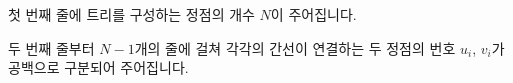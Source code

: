 첫 번째 줄에 트리를 구성하는 정점의 개수 $N$이 주어집니다.

두 번째 줄부터 $N-1$개의 줄에 걸쳐 각각의 간선이 연결하는 두 정점의 번호 $u_i$, $v_i$가 공백으로 구분되어 주어집니다.


